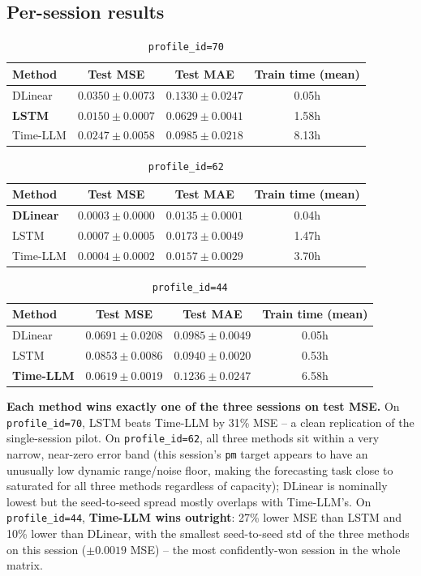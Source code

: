 \documentclass[11pt]{article}
\newcommand{\code}[1]{\texttt{#1}}
\begin{document}
\subsection{Per-session results}

\begin{table}[h]
\centering
\caption{\code{profile\_id=70}}
\begin{tabular}{@{}lccc@{}}
\toprule
Method & Test MSE & Test MAE & Train time (mean) \\
\midrule
DLinear & $0.0350 \pm 0.0073$ & $0.1330 \pm 0.0247$ & 0.05h \\
\textbf{LSTM} & $\mathbf{0.0150 \pm 0.0007}$ & $\mathbf{0.0629 \pm 0.0041}$ & 1.58h \\
Time-LLM & $0.0247 \pm 0.0058$ & $0.0985 \pm 0.0218$ & 8.13h \\
\bottomrule
\end{tabular}
\end{table}

\begin{table}[h]
\centering
\caption{\code{profile\_id=62}}
\begin{tabular}{@{}lccc@{}}
\toprule
Method & Test MSE & Test MAE & Train time (mean) \\
\midrule
\textbf{DLinear} & $\mathbf{0.0003 \pm 0.0000}$ & $\mathbf{0.0135 \pm 0.0001}$ & 0.04h \\
LSTM & $0.0007 \pm 0.0005$ & $0.0173 \pm 0.0049$ & 1.47h \\
Time-LLM & $0.0004 \pm 0.0002$ & $0.0157 \pm 0.0029$ & 3.70h \\
\bottomrule
\end{tabular}
\end{table}

\begin{table}[h]
\centering
\caption{\code{profile\_id=44}}
\begin{tabular}{@{}lccc@{}}
\toprule
Method & Test MSE & Test MAE & Train time (mean) \\
\midrule
DLinear & $0.0691 \pm 0.0208$ & $0.0985 \pm 0.0049$ & 0.05h \\
LSTM & $0.0853 \pm 0.0086$ & $0.0940 \pm 0.0020$ & 0.53h \\
\textbf{Time-LLM} & $\mathbf{0.0619 \pm 0.0019}$ & $0.1236 \pm 0.0247$ & 6.58h \\
\bottomrule
\end{tabular}
\end{table}

\textbf{Each method wins exactly one of the three sessions on test MSE.} On
\code{profile\_id=70}, LSTM beats Time-LLM by 31\% MSE -- a clean replication
of the single-session pilot. On \code{profile\_id=62}, all three methods sit
within a very narrow, near-zero error band (this session's \code{pm} target
appears to have an unusually low dynamic range/noise floor, making the
forecasting task close to saturated for all three methods regardless of
capacity); DLinear is nominally lowest but the seed-to-seed spread mostly
overlaps with Time-LLM's. On \code{profile\_id=44}, \textbf{Time-LLM wins
outright}: 27\% lower MSE than LSTM and 10\% lower than DLinear, with the
smallest seed-to-seed std of the three methods on this session
($\pm 0.0019$ MSE) -- the most confidently-won session in the whole matrix.
\end{document}
